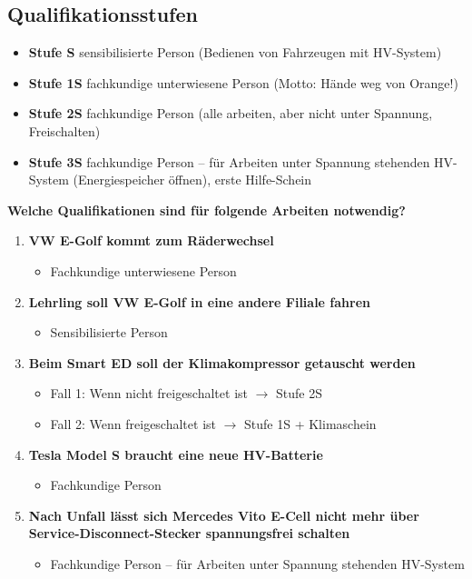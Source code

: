 \subsection{Qualifikationsstufen}\label{qualifikationsstufen-1}

\begin{itemize}
\item
  \textbf{Stufe S} sensibilisierte Person (Bedienen von Fahrzeugen mit
  HV-System)
\item
  \textbf{Stufe 1S} fachkundige unterwiesene Person (Motto: Hände weg
  von Orange!)
\item
  \textbf{Stufe 2S} fachkundige Person (alle arbeiten, aber nicht unter
  Spannung, Freischalten)
\item
  \textbf{Stufe 3S} fachkundige Person -- für Arbeiten unter Spannung
  stehenden HV-System (Energiespeicher öffnen), erste Hilfe-Schein
\end{itemize}

\textbf{Welche Qualifikationen sind für folgende Arbeiten notwendig?}

\begin{enumerate}
\item
  \textbf{VW E-Golf kommt zum Räderwechsel}

  \begin{itemize}
  \item
    Fachkundige unterwiesene Person
  \end{itemize}
\item
  \textbf{Lehrling soll VW E-Golf in eine andere Filiale fahren}

  \begin{itemize}
  \item
    Sensibilisierte Person
  \end{itemize}
\item
  \textbf{Beim Smart ED soll der Klimakompressor getauscht werden}

  \begin{itemize}
  \item
    Fall 1: Wenn nicht freigeschaltet ist $\to$ Stufe 2S
  \item
    Fall 2: Wenn freigeschaltet ist $\to$ Stufe 1S + Klimaschein
  \end{itemize}
\item
  \textbf{Tesla Model S braucht eine neue HV-Batterie}

  \begin{itemize}
  \item
    Fachkundige Person
  \end{itemize}
\item
  \textbf{Nach Unfall lässt sich Mercedes Vito E-Cell nicht mehr über
  Service-Disconnect-Stecker spannungsfrei schalten}

  \begin{itemize}
  \item
    Fachkundige Person -- für Arbeiten unter Spannung stehenden
    HV-System
  \end{itemize}
\end{enumerate}

